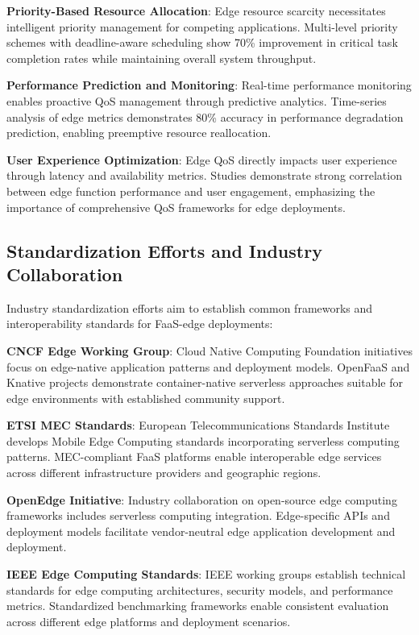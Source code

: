 \textbf{Priority-Based Resource Allocation}: Edge resource scarcity necessitates intelligent priority management for competing applications. Multi-level priority schemes with deadline-aware scheduling show 70\% improvement in critical task completion rates while maintaining overall system throughput.

\textbf{Performance Prediction and Monitoring}: Real-time performance monitoring enables proactive QoS management through predictive analytics. Time-series analysis of edge metrics demonstrates 80\% accuracy in performance degradation prediction, enabling preemptive resource reallocation.

\textbf{User Experience Optimization}: Edge QoS directly impacts user experience through latency and availability metrics. Studies demonstrate strong correlation between edge function performance and user engagement, emphasizing the importance of comprehensive QoS frameworks for edge deployments.

\subsection{Standardization Efforts and Industry Collaboration}

Industry standardization efforts aim to establish common frameworks and interoperability standards for FaaS-edge deployments:

\textbf{CNCF Edge Working Group}: Cloud Native Computing Foundation initiatives focus on edge-native application patterns and deployment models. OpenFaaS and Knative projects demonstrate container-native serverless approaches suitable for edge environments with established community support.

\textbf{ETSI MEC Standards}: European Telecommunications Standards Institute develops Mobile Edge Computing standards incorporating serverless computing patterns. MEC-compliant FaaS platforms enable interoperable edge services across different infrastructure providers and geographic regions.

\textbf{OpenEdge Initiative}: Industry collaboration on open-source edge computing frameworks includes serverless computing integration. Edge-specific APIs and deployment models facilitate vendor-neutral edge application development and deployment.

\textbf{IEEE Edge Computing Standards}: IEEE working groups establish technical standards for edge computing architectures, security models, and performance metrics. Standardized benchmarking frameworks enable consistent evaluation across different edge platforms and deployment scenarios.

